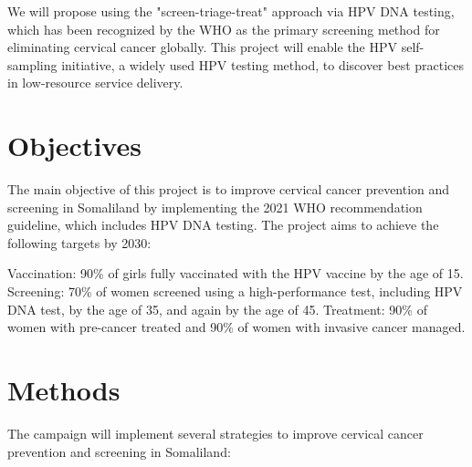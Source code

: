 \documentclass{article}
\begin{document}
We will propose using the "screen-triage-treat" approach via HPV DNA testing, which has been recognized by the WHO as the primary screening method for eliminating cervical cancer globally\citep{whocpc2021}.
This project will enable the HPV self-sampling initiative, a widely used HPV testing method, to discover best practices in low-resource service delivery.

\section{Objectives}
The main objective of this project is to improve cervical cancer prevention and screening in Somaliland by implementing the 2021 WHO recommendation guideline, which includes HPV DNA testing. 
The project aims to achieve the following targets by 2030\citep{wcced2018}: 
\begin{outline} 
\1 Vaccination: 90\% of girls fully vaccinated with the HPV vaccine by the age of 15. 
\1 Screening: 70\% of women screened using a high-performance test, including HPV DNA test, by the age of 35, and again by the age of 45. 
\1 Treatment: 90\% of women with pre-cancer treated and 90\% of women with invasive cancer managed. \end{outline}


\section{Methods}
The campaign will implement several strategies to improve cervical cancer prevention and screening in Somaliland: 
\end{document}
